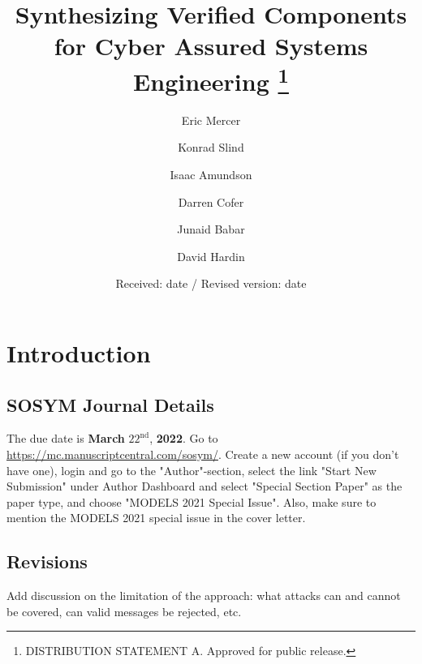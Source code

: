 \documentclass[global,twocolumn]{svjour}
\begin{document}
\title{
  Synthesizing Verified Components for Cyber Assured Systems Engineering
  \thanks{DISTRIBUTION STATEMENT A.  Approved for public release.}
}

\author{
  Eric Mercer    \and 
  Konrad Slind   \and
  Isaac Amundson \and
  Darren Cofer   \and
  Junaid Babar   \and
  David Hardin
}


\date{Received: date / Revised version: date}

\maketitle

\begin{abstract}

\end{abstract}

\section{Introduction} \label{sec:intro}


\subsection{SOSYM Journal Details}
The due date is \textbf{March} $22^\mathrm{nd}$, \textbf{2022}.
Go to \url{https://mc.manuscriptcentral.com/sosym/}. Create a new account (if you don't have one), login and go to the "Author"-section, select the link "Start New Submission" under Author Dashboard and select "Special Section Paper" as the paper type, and choose "MODELS 2021 Special Issue". Also, make sure to mention the MODELS 2021 special issue in the cover letter.

\subsection{Revisions}
\begin{compactitem}
  \item Add discussion on the limitation of the approach: what attacks can and cannot be covered, can valid messages be rejected, etc.
\end{compactitem}
\end{document}
